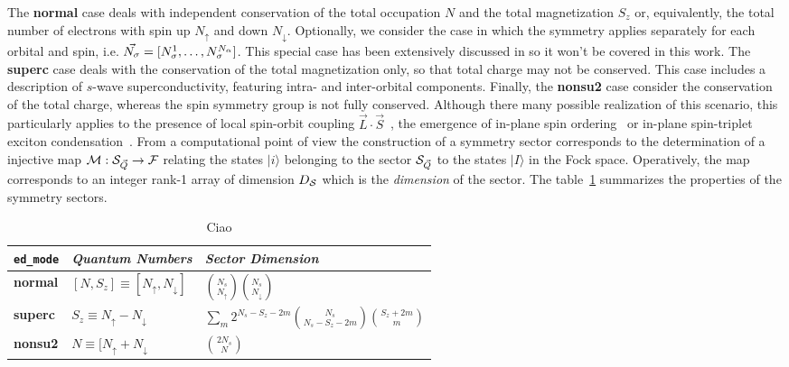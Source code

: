 \documentclass[final,3p,10pt]{elsarticle}
\newcommand{\onlinecite}[1]{\nocite{#1}\hspace{-0.1cm}\citenum{#1}}
\newcommand{\ket}[1]
{|#1\rangle}
\def\a{\alpha}       \def\b{\beta}   \def\g{\gamma}   \def\d{\delta}
\def\up{\uparrow} \def\down{\downarrow} \def\dw{\downarrow}
\begin{document}
The {\bf normal} case deals with independent conservation of the total occupation $N$
and the total magnetization $S_z$ or, equivalently, the total number of electrons with spin up $N_\up$ and down
$N_\dw$. Optionally, we consider the case in which the symmetry
applies separately for each orbital and spin,
i.e. $\vec{N_\s}=[N^1_\s,\dots,N^{N_\a}_\s]$. This special case has been
extensively discussed in \onlinecite{Amaricci2022} so it won't be covered in
this work.
%
The {\bf superc} case deals with the conservation of the total
magnetization only, so that total charge may not be conserved. This
case includes a description of $s$-wave superconductivity, featuring
intra- and inter-orbital components.
%
Finally, the {\bf nonsu2} case consider the conservation of the total
charge, whereas the spin symmetry group is not fully
conserved. Although there many possible realization of this scenario,
this particularly applies to the presence of local spin-orbit coupling
$\vec{L}\cdot\vec{S}$~\cite{something}, the emergence of in-plane spin ordering~\cite{KM} or
in-plane spin-triplet exciton condensation~\cite{ExcitonPRB,Amaricci,Blason}.  
%
From a computational point of view the construction of a symmetry
sector corresponds to the determination of a injective map
${\cal M}:{\cal S}_{\vec{Q}}\rightarrow {\cal F}$ relating the states $\ket{i}$
belonging to the sector ${\cal S}_{\vec{Q}}$ to the states $\ket{I}$ in the
Fock space. Operatively, the map corresponds to an integer rank-1
array of dimension $D_{\cal S}$ which is the {\it dimension} of the
sector. 
The table~\ref{TabSector} summarizes the properties of the symmetry
sectors. 

\begin{table}%
  \label{TabSector}
\begin{center}
\begin{tabularx}{\linewidth}{ |X|X|X| } 
 \hline
  {\tt ed\_mode} & {\it Quantum Numbers} & {\it Sector Dimension} \\
  \hline
  {\bf normal} & $[N,S_z]\equiv[N_\up,N_\dw]$ &
                                                $\binom{N_s}{N_\up}\binom{N_s}{N_\dw}$
  \\
  \hline
  {\bf superc} & $S_z\equiv N_\up-N_\dw$ &  $\sum_m 2^{N_s-S_z-2m}\binom{N_s}{N_s-S_z-2m}\binom{S_z+2m}{m}$
  \\
  \hline
  {\bf nonsu2} & $N \equiv[N_\up+N_\dw$ & $\binom{2N_s}{N}$ \\ 
 \hline
\end{tabularx}
\end{center}
\caption{Ciao}
\end{table}
\end{document}
